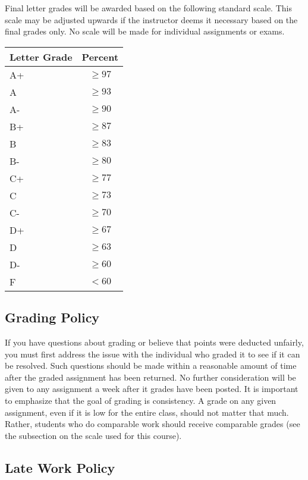 \documentclass[12pt]{scrartcl}
\begin{document}
Final letter grades will be awarded based on the following 
standard scale. This scale may be adjusted upwards if the 
instructor deems it necessary based on the final grades only.  
No scale will be made for individual assignments or exams.

\begin{table}[h]
\centering
\begin{tabular}{p{1cm}c}
Letter Grade & Percent \\
\hline\hline
A+ & $\geq 97$ \\
A  & $\geq 93$ \\
A- & $\geq 90$ \\
B+ & $\geq 87$ \\
B  & $\geq 83$ \\
B- & $\geq 80$ \\
C+ & $\geq 77$ \\
C  & $\geq 73$ \\
C- & $\geq 70$ \\
D+ & $\geq 67$ \\
D  & $\geq 63$ \\
D- & $\geq 60$ \\
F  & $<60$ \\
\end{tabular}
\end{table}

\subsection{Grading Policy}

If you have questions about grading or believe that points were 
deducted unfairly, you must first address the issue with the 
individual who graded it to see if it can be resolved.  Such 
questions should be made within a reasonable amount of time 
after the graded assignment has been returned.  No further 
consideration will be given to any assignment a week after 
it grades have been posted.  It is important to emphasize that 
the goal of grading is consistency.  A grade on any given 
assignment, even if it is low for the entire class, should 
not matter that much.  Rather, students who do comparable 
work should receive comparable grades (see the subsection 
on the scale used for this course).

\subsection{Late Work Policy}
\end{document}
